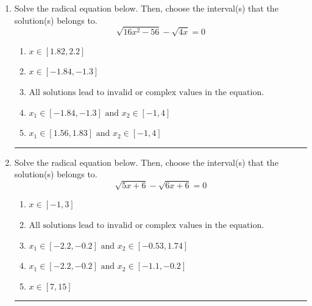 \documentclass[14pt]{extbook}
\newcommand{\litem}[1]{\item#1\hspace*{-1cm}\rule{\textwidth}{0.4pt}}
\begin{document}
\begin{enumerate}
\litem{
Solve the radical equation below. Then, choose the interval(s) that the solution(s) belongs to.\[ \sqrt{16 x^2 - 56} - \sqrt{4 x} = 0 \]\begin{enumerate}[label=\Alph*.]
\item \( x \in [1.82,2.2] \)
\item \( x \in [-1.84,-1.3] \)
\item \( \text{All solutions lead to invalid or complex values in the equation.} \)
\item \( x_1 \in [-1.84, -1.3] \text{ and } x_2 \in [-1,4] \)
\item \( x_1 \in [1.56, 1.83] \text{ and } x_2 \in [-1,4] \)

\end{enumerate} }
\litem{
Solve the radical equation below. Then, choose the interval(s) that the solution(s) belongs to.\[ \sqrt{5 x + 6} - \sqrt{6 x + 6} = 0 \]\begin{enumerate}[label=\Alph*.]
\item \( x \in [-1,3] \)
\item \( \text{All solutions lead to invalid or complex values in the equation.} \)
\item \( x_1 \in [-2.2, -0.2] \text{ and } x_2 \in [-0.53,1.74] \)
\item \( x_1 \in [-2.2, -0.2] \text{ and } x_2 \in [-1.1,-0.2] \)
\item \( x \in [7,15] \)


\end{enumerate}}
\end{enumerate}
\end{document}
